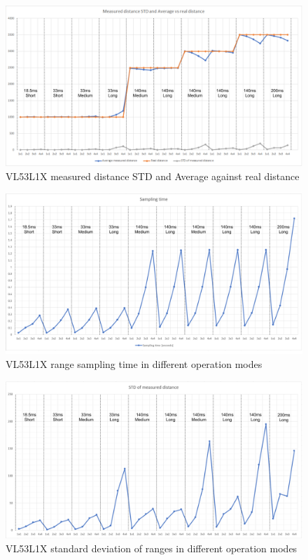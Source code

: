 \begin{figure}[ht]
    \centering
    \includegraphics[width=150mm, keepaspectratio]{figures/vl53l1x_measurements_opmodes.png}
    \caption{VL53L1X measured distance STD and Average against real distance}
    \label{fig:vl53l1x_meas_opmodes}
\end{figure}
\begin{figure}[!h]
    \centering
    \includegraphics[width=150mm, keepaspectratio]{figures/vl53l1x_measurements_opmodes_sampling.png}
    \caption{VL53L1X range sampling time in different operation modes}
    \label{fig:vl53l1x_meas_opmodes_sampling}
\end{figure}

\newpage

\begin{figure}[!h]
    \centering
    \includegraphics[width=150mm, keepaspectratio]{figures/vl53l1x_measurements_opmodes_std.png}
    \caption{VL53L1X standard deviation of ranges in different operation modes}
    \label{fig:vl53l1x_meas_opmodes_std}
\end{figure}

